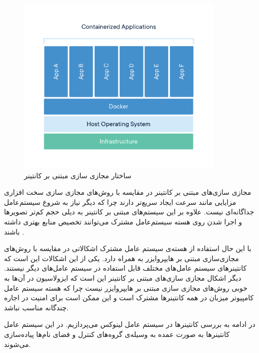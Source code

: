      \begin{figure}[]
        \centerline{\includegraphics[width=10cm]{graphics/chapter_2/container}}
        \caption{ساختار مجازی سازی مبتنی بر کانتینر \cite{2018are}}
        \label{fig:chapter_2:container}
      \end{figure}
      
      مجازی سازی‌های مبتنی بر کانتینر در مقایسه با روش‌های مجازی سازی سخت افزاری مزایایی مانند سرعت ایجاد سریع‌تر دارند چرا که دیگر نیاز به شروع سیستم‌عامل جداگانه‌ای نیست.
      علاوه بر این سیستم‌های مبتنی بر کانتینر به دیلی حجم کم‌تر  تصویر‌ها و اجرا شدن روی هسته سیستم‌عامل مشترک می‌توانند تخصیص منابع بهتری داشته باشند \cite{morabito2015hypervisors}.

      با این حال استفاده از هسته‌ی سیستم عامل مشترک اشکالاتی در مقایسه با روش‌های مجازی‌سازی مبتنی بر {هایپروایزر} به همراه دارد.
      یکی از این اشکالات این است که کانتینر‌های سیستم عامل‌های مختلف قابل استفاده در سیستم عامل‌های دیگر نیستند.
      دیگر اشکال مجازی سازی‌های مبتنی بر کانتینر این است که ایزولاسیون در آن‌ها به خوبی روش‌های مجازی سازی مبتنی بر {هایپروایزر} نیست \cite{bui2015analysis} چرا که هسته سیستم عامل کامپیوتر میزبان در همه کانتینر‌ها مشترک است و این ممکن است برای امنیت در اجاره چندگانه مناسب نباشد.

      در ادامه به بررسی کانتینر‌ها در سیستم عامل لینوکس می‌پردازیم.
      در این سیستم عامل کانتینر‌ها به صورت عمده به وسیله‌ی گروه‌های کنترل\cite{tejun2015Linux} و فضای نام‌ها\cite{2015Linux} پیاده‌سازی می‌شوند.

